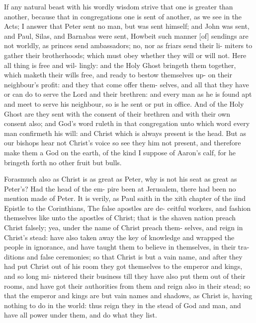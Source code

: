 \documentclass{custom}
\begin{document}
If any natural beast with his wordly wisdom strive that 
one is greater than another, because that in congregations 
one is sent of another, as we see in the Acts; I answer 
that Peter sent no man, but was sent himself; and John 
was sent, and Paul, Silas, and Barnabas were sent, 
Howbeit such manner [of] sendings are not worldly, as 
princes send ambassadors; no, nor as friars send their li- 
miters to gather their brotherhoods; which must obey 
whether they will or will not. Here all thing is free and wil- 
lingly: and the Holy Ghost bringeth them together, which 
maketh their wills free, and ready to bestow themselves up- 
on their neighbour's profit: and they that come offer them- 
selves, and all that they have or can do to serve the Lord 
and their brethren: and every man as he is found apt and 
meet to serve his neighbour, so is he sent or put in office. 
And of the Holy Ghost are they sent with the consent of 
their brethren and with their own consent also; and God's 
word ruleth in that congregation unto which word every 
man confirmeth his will: and Christ which is always present 
is the head. But as our bishops hear not Christ's voice 
so see they him not present, and therefore make them a 
God on the earth, of the kind I suppose of Aaron's calf, 
for he bringeth forth no other fruit but bulls. 

Forasmuch also as Christ is as great as Peter, why is 
not his seat as great as Peter's? Had the head of the em- 
pire been at Jerusalem, there had been no mention made of 
Peter. It is verily, as Paul saith in the xith chapter of the 
iind Epistle to the Corinthians, The false apostles are de- 
ceitful workers, and fashion themselves like unto the 
apostles of Christ; that is the shaven nation preach Christ 
falsely; yea, under the name of Christ preach them- 
selves, and reign in Christ's stead: have also taken away 
the key of knowledge and wrapped the people in ignorance, 
and have taught them to believe in themselves, in their tra- 
ditions and false ceremonies; so that Christ is but a vain
name, and after they had put Christ out of his room they
got themselves to the emperor and kings, and so long mi- 
nistered their business till they have also put them out of 
their rooms, and have got their authorities from them and
reign also in their stead; so that the emperor and kings are 
but vain names and shadows, as Christ is, having nothing to 
do in the world: thus reign they in the stead of God and 
man, and have all power under them, and do what they 
list.
\end{document}

